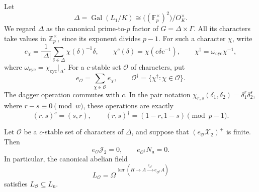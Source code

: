 Let
\[
 \Delta=\operatorname{Gal}(L_1/K)
       \cong\bigl((\mathbb F_p^\times)^2\bigr)/O_K^\times .
\]
We regard \(\Delta\) as the canonical prime-to-\(p\) factor of
\(G=\Delta\times\Gamma\).
All its characters take values in \(\mathbb Z_p^\times\), since
its exponent divides \(p-1\).
For such a character \(\chi\), write
\[
 e_\chi=\frac1{|\Delta|}
             \sum_{\delta\in\Delta}\chi(\delta)^{-1}\delta,
 \qquad
 \chi^c(\delta)=\chi(c\delta c^{-1}),\qquad
 \chi^\dagger=\omega_{\mathrm{cyc}}\chi^{-1},
\]
where \(\omega_{\mathrm{cyc}}=\chi_{\mathrm{cyc}}|_\Delta\).
For a \(c\)-stable set \(\mathcal O\) of characters, put
\[
 e_{\mathcal O}=\sum_{\chi\in\mathcal O}e_\chi,\qquad
 \mathcal O^\dagger=\{\chi^\dagger:\chi\in\mathcal O\}.
\]
The dagger operation commutes with \(c\).
In the pair notation
\(\chi_{r,s}(\delta_1,\delta_2)=\delta_1^r\delta_2^s\),
where \(r-s\equiv0\pmod w\), these operations are exactly
\[
                  (r,s)^c=(s,r),\qquad
                  (r,s)^\dagger=(1-r,1-s)
                                \pmod{p-1}.
\]

\begin{proposition}\label{prop:cm-component-unit-detection}
Let \(\mathcal O\) be a \(c\)-stable set of characters of
\(\Delta\), and suppose that
\((e_{\mathcal O}\mathcal X_2)^+\) is finite.
Then
\[
 e_{\mathcal O}\mathcal J_2=0,\qquad
 e_{\mathcal O^\dagger}N_{\mathrm u}=0.
\]
In particular, the canonical abelian field
\[
 L_{\mathcal O}
   =\Omega^{\,\ker(H\longrightarrow A
                       \xrightarrow{\,e_{\mathcal O^\dagger}\,}
                                e_{\mathcal O^\dagger}A)}
\]
satisfies \(L_{\mathcal O}\subseteq L_{\mathrm u}\).
\end{proposition}

